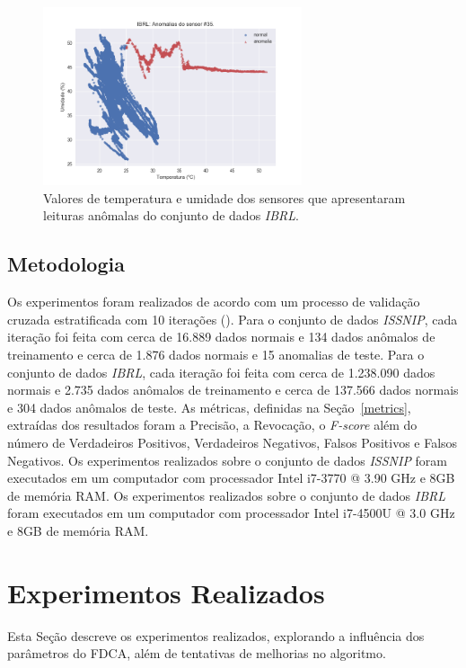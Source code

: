 \documentclass[cic,tc]{iiufrgs}
\begin{document}
\begin{figure}
\begin{adjustwidth}{-1in}{-.8in}
\includegraphics[width=0.68\textwidth]{IBRL_35.png}
\caption{Valores de temperatura e umidade dos sensores que apresentaram leituras anômalas do conjunto de dados \textit{IBRL}.}
\label{ibrl_anomalos}
\end{adjustwidth}
\end{figure}

\subsection{Metodologia}
Os experimentos foram realizados de acordo com um processo de validação cruzada estratificada com 10 iterações (\cite{bootstrap1997}). Para o conjunto de dados \textit{ISSNIP}, cada iteração foi feita com cerca de 16.889 dados normais e 134 dados anômalos de treinamento e cerca de 1.876 dados normais e 15 anomalias de teste. Para o conjunto de dados \textit{IBRL}, cada iteração foi feita com cerca de 1.238.090 dados normais e 2.735 dados anômalos de treinamento e cerca de 137.566 dados normais e 304 dados anômalos de teste. As métricas, definidas na Seção~\ref{metrics}, extraídas dos resultados foram a Precisão, a Revocação, o \textit{F-score} além do número de Verdadeiros Positivos, Verdadeiros Negativos, Falsos Positivos e Falsos Negativos. Os experimentos realizados sobre o conjunto de dados \textit{ISSNIP} foram executados em um computador com processador Intel i7-3770 @ 3.90 GHz e 8GB de memória RAM. Os experimentos realizados sobre o conjunto de dados \textit{IBRL} foram executados em um computador com processador Intel i7-4500U @ 3.0 GHz e 8GB de memória RAM.  

\section{Experimentos Realizados}
Esta Seção descreve os experimentos realizados, explorando a influência dos parâmetros do FDCA, além de tentativas de melhorias no algoritmo.
\end{document}
